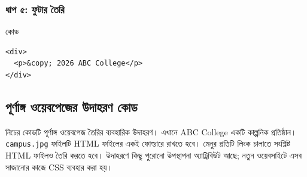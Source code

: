 \subsubsection{ধাপ ৫: ফুটার তৈরি}

\begin{examplebox}{কোড}
\begin{verbatim}
<div>
  <p>&copy; 2026 ABC College</p>
</div>
\end{verbatim}
\end{examplebox}



\subsection{পূর্ণাঙ্গ ওয়েবপেজের উদাহরণ কোড}

নিচের কোডটি পূর্ণাঙ্গ ওয়েবপেজ তৈরির ব্যবহারিক উদাহরণ। এখানে ABC College একটি কাল্পনিক প্রতিষ্ঠান। \texttt{campus.jpg} ফাইলটি HTML ফাইলের একই ফোল্ডারে রাখতে হবে। মেনুর প্রতিটি লিংক চালাতে সংশ্লিষ্ট HTML ফাইলও তৈরি করতে হবে। উদাহরণে কিছু পুরোনো উপস্থাপনা অ্যাট্রিবিউট আছে; নতুন ওয়েবসাইটে এসব সাজানোর কাজে CSS ব্যবহার করা হয়।

